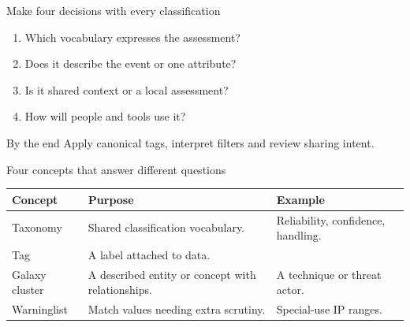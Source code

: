 \begin{frame}[t,plain]
    \titlepage
\end{frame}

\begin{frame}{Make four decisions with every classification}
    \begin{enumerate}
        \item Which vocabulary expresses the assessment?
        \item Does it describe the event or one attribute?
        \item Is it shared context or a local assessment?
        \item How will people and tools use it?
    \end{enumerate}
    \begin{block}{By the end}
        Apply canonical tags, interpret filters and review sharing intent.
    \end{block}
\end{frame}

\begin{frame}{Four concepts that answer different questions}
    \small
    \begin{tabular}{@{}P{2.2cm}P{4cm}P{4cm}@{}}
        \toprule
        Concept & Purpose & Example \\
        \midrule
        Taxonomy & Shared classification vocabulary. & Reliability, confidence, handling. \\
        Tag & A label attached to data. &  \\
        Galaxy cluster & A described entity or concept with relationships. & A technique or threat actor. \\
        Warninglist & Match values needing extra scrutiny. & Special-use IP ranges. \\
        \bottomrule
    \end{tabular}
\end{frame}

